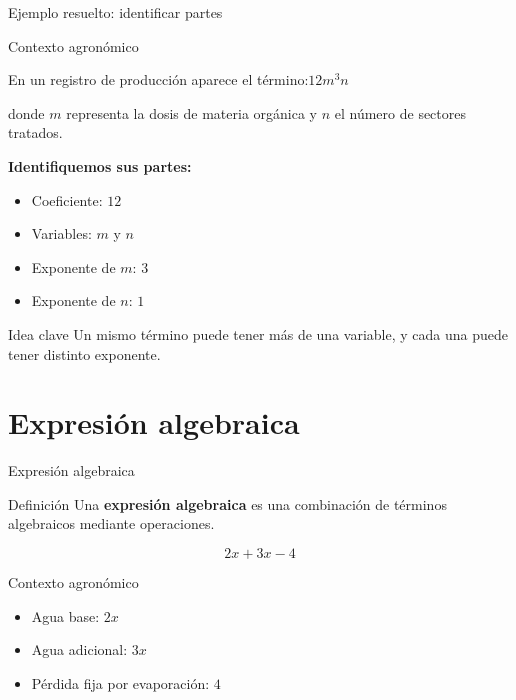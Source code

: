 \documentclass[handout,aspectratio=169,12pt]{beamer}
\newcommand{\IdeaClave}[1]{
	\begin{alertblock}{Idea clave}
		#1
	\end{alertblock}
}
\newcommand{\Agronomia}[1]{
	\begin{exampleblock}{Contexto agronómico}
		#1
	\end{exampleblock}
}
\begin{document}
	\begin{frame}{Ejemplo resuelto: identificar partes}
		\Agronomia{
			En un registro de producción aparece el término:\quad $12m^3n$
			
			\smallskip 
			
			donde \(m\) representa la dosis de materia orgánica y \(n\) el número de sectores tratados.
		}
		
		\pause
		\textbf{Identifiquemos sus partes:}
		\begin{itemize}
			\item Coeficiente: \(12\)
			\pause
			\item Variables: \(m\) y \(n\)
			\pause
			\item Exponente de \(m\): \(3\)
			\pause
			\item Exponente de \(n\): \(1\)
		\end{itemize}
		
		\pause
		\IdeaClave{Un mismo término puede tener más de una variable, y cada una puede tener distinto exponente.}
	\end{frame}
	
	\section{Expresión algebraica}
	\begin{frame}{Expresión algebraica}
		\begin{block}{Definición}
			Una \textbf{expresión algebraica} es una combinación de términos algebraicos mediante operaciones.
		\end{block}
		
		\pause
		\[
		2x + 3x - 4
		\]
		
		\pause
		\Agronomia{
			\begin{itemize}
				\item Agua base: \(2x\)
				\pause
				\item Agua adicional: \(3x\)
				\pause
				\item Pérdida fija por evaporación: \(4\)
			\end{itemize}
		}
	\end{frame}
	
\end{document}
